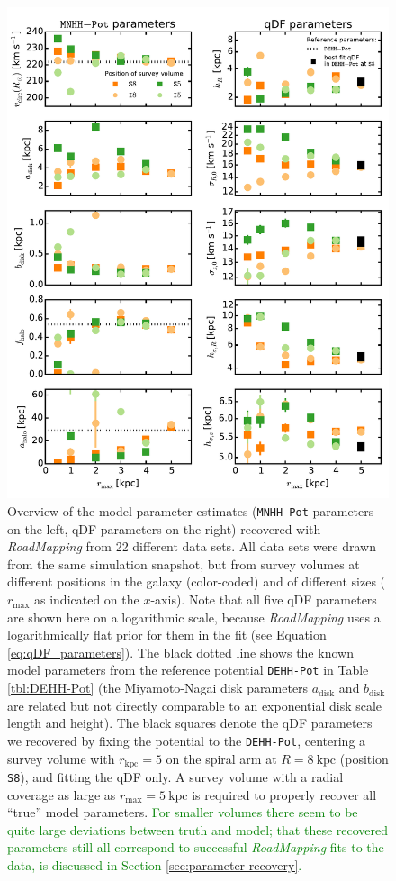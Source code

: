 \documentclass[iop,revtex4,numberedappendix,appendixfloats]{emulateapj}
\newcommand{\RM}{{\sl RoadMapping}}
\newcommand{\NEW}[1]{\textcolor{Green}{#1}}
\begin{document}
\begin{figure}[!htbp]
\centering
\includegraphics[width=\columnwidth]{fig/MNdHHdiffSph2_violins_3.pdf}
\caption{Overview of the model parameter estimates (\texttt{MNHH-Pot} parameters on the left, qDF parameters on the right) recovered with \RM{} from 22 different data sets. All data sets were drawn from the same simulation snapshot, but from survey volumes at different positions in the galaxy (color-coded) and of different sizes ($r_\text{max}$ as indicated on the $x$-axis). Note that all five qDF parameters are shown here on a logarithmic scale, because \RM{} uses a logarithmically flat prior for them in the fit (see Equation \eqref{eq:qDF_parameters}). The black dotted line shows the known model parameters from the reference potential \texttt{DEHH-Pot} in Table \ref{tbl:DEHH-Pot} (the Miyamoto-Nagai disk parameters $a_\text{disk}$ and $b_\text{disk}$ are related but not directly comparable to an exponential disk scale length and height). The black squares denote the qDF parameters we recovered by fixing the potential to the \texttt{DEHH-Pot}, centering a survey volume with $r_\text{kpc}=5$ on the spiral arm at $R=8~\text{kpc}$ (position \texttt{S8}), and fitting the qDF only. A survey volume with a radial coverage as large as $r_\text{max}=5~\text{kpc}$ is required to properly recover all ``true'' model parameters. \NEW{For smaller volumes there seem to be quite large deviations between truth and model; that these recovered parameters still all correspond to successful \RM{} fits to the data, is discussed in Section \ref{sec:parameter recovery}.}}
\label{fig:model_parameters}
\end{figure}
\end{document}
